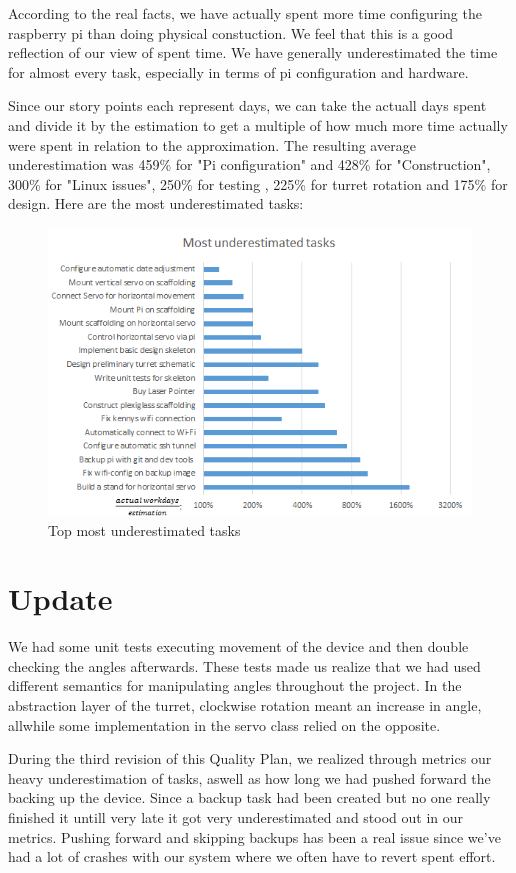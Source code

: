 \documentclass{article}
\begin{document}
According to the real facts, we have actually spent more time configuring the raspberry pi than doing physical constuction.
We feel that this is a good reflection of our view of spent time.
We have generally underestimated the time for almost every task, especially in terms of pi configuration and hardware.

Since our story points each represent days, we can take the actuall days spent and divide it by the estimation to get a multiple of how much more time actually were spent in relation to the approximation. The resulting average underestimation was 459\% for "Pi configuration" and 428\% for "Construction", 300\% for "Linux issues",  250\% for testing , 225\% for turret rotation and 175\% for design.
\clearpage
Here are the most underestimated tasks:
\begin{figure}[H]
\center
\includegraphics{underest.png}
\caption{Top most underestimated tasks}
\end{figure}

\section{Update}
We had some unit tests executing movement of the device and then double checking the angles afterwards. 
These tests made us realize that we had used different semantics for manipulating angles throughout the project.
In the abstraction layer of the turret, clockwise rotation meant an increase in angle, allwhile some implementation in the servo class relied on the opposite.

During the third revision of this Quality Plan, we realized through metrics our heavy underestimation of tasks, aswell as how long we had pushed forward the backing up the device.
Since a backup task had been created but no one really finished it untill very late it got very underestimated and stood out in our metrics.
Pushing forward and skipping backups has been a real issue since we've had a lot of crashes with our system where we often have to revert spent effort.
\end{document}
